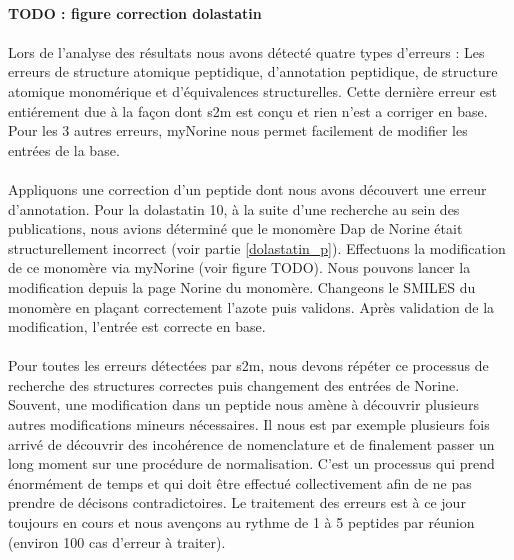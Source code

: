 \documentclass[12pt,french,twoside]{report}
\begin{document}
\paragraph{TODO : figure correction dolastatin}

\paragraph{}Lors de l'analyse des résultats nous avons détecté quatre types d'erreurs : Les erreurs de structure atomique peptidique, d'annotation peptidique, de structure atomique monomérique et d'équivalences structurelles.
Cette dernière erreur est entiérement due à la façon dont s2m est conçu et rien n'est a corriger en base.
Pour les 3 autres erreurs, myNorine nous permet facilement de modifier les entrées de la base.

\paragraph{}Appliquons une correction d'un peptide dont nous avons découvert une erreur d'annotation.
Pour la dolastatin 10, à la suite d'une recherche au sein des publications, nous avions déterminé que le monomère Dap de Norine était structurellement incorrect (voir partie \ref{dolastatin_p}).
Effectuons la modification de ce monomère via myNorine (voir figure TODO).
Nous pouvons lancer la modification depuis la page Norine du monomère.
Changeons le SMILES du monomère en plaçant correctement l'azote puis validons.
Après validation de la modification, l'entrée est correcte en base.

\paragraph{}Pour toutes les erreurs détectées par s2m, nous devons répéter ce processus de recherche des structures correctes puis changement des entrées de Norine.
Souvent, une modification dans un peptide nous amène à découvrir plusieurs autres modifications mineurs nécessaires.
Il nous est par exemple plusieurs fois arrivé de découvrir des incohérence de nomenclature et de finalement passer un long moment sur une procédure de normalisation.
C'est un processus qui prend énormément de temps et qui doit être effectué collectivement afin de ne pas prendre de décisons contradictoires.
Le traitement des erreurs est à ce jour toujours en cours et nous avençons au rythme de 1 à 5 peptides par réunion (environ 100 cas d'erreur à traiter).
\end{document}
